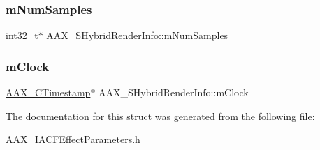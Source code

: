 \subsubsection{\texorpdfstring{mNumSamples}{mNumSamples}}
{\footnotesize\ttfamily int32\+\_\+t$\ast$ A\+A\+X\+\_\+\+S\+Hybrid\+Render\+Info\+::m\+Num\+Samples}

\mbox{\label{a01673_ad98d7a8b5a0cfee06b31a81fe9ebe7fb}} 
\subsubsection{\texorpdfstring{mClock}{mClock}}
{\footnotesize\ttfamily \mbox{\hyperlink{a00392_aae7325dbfa53a983f208a68cb563fba5}{A\+A\+X\+\_\+\+C\+Timestamp}}$\ast$ A\+A\+X\+\_\+\+S\+Hybrid\+Render\+Info\+::m\+Clock}



The documentation for this struct was generated from the following file\+:\begin{DoxyCompactItemize}
\item 
\mbox{\hyperlink{a00530}{A\+A\+X\+\_\+\+I\+A\+C\+F\+Effect\+Parameters.\+h}}\end{DoxyCompactItemize}
